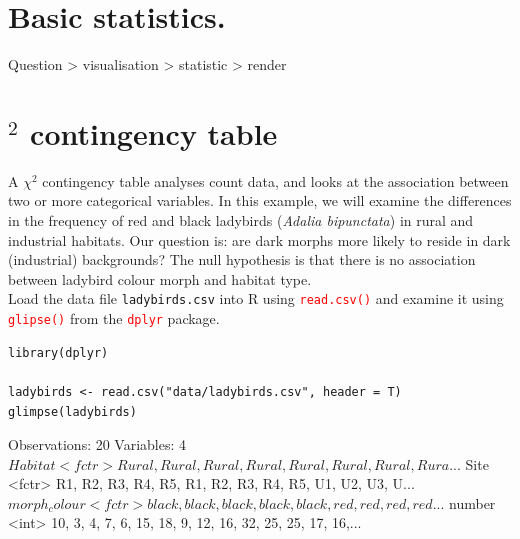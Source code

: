 \documentclass[a4paper,12pt]{article}
\newcommand\code[1]{\textcolor{red}{\texttt{#1}}}
\begin{document}

\section{Basic statistics.}

Question > visualisation > statistic > render

\section{\chi$^{2}$ contingency table}

A $\chi ^{2}$ contingency table analyses count data, and looks at the association between two or more categorical variables. In this example, we will examine the differences in the frequency of red and black ladybirds (\textit{Adalia bipunctata}) in rural and industrial habitats. Our question is: are dark morphs more likely to reside in dark (industrial) backgrounds? The null hypothesis is that there is no association between ladybird colour morph and habitat type. \\

Load the data file \texttt{ladybirds.csv} into R using \code{read.csv()} and examine it using \code{glipse()} from the \code{dplyr} package.\\

\begin{shaded}
\begin{verbatim}
library(dplyr)

ladybirds <- read.csv("data/ladybirds.csv", header = T)
glimpse(ladybirds)
\end{verbatim}
\end{shaded}

\begin{Schunk}
\begin{Soutput}
Observations: 20
Variables: 4
$ Habitat      <fctr> Rural, Rural, Rural, Rural, Rural, Rural, Rural, Rura...
$ Site         <fctr> R1, R2, R3, R4, R5, R1, R2, R3, R4, R5, U1, U2, U3, U...
$ morph_colour <fctr> black, black, black, black, black, red, red, red, red...
$ number       <int> 10, 3, 4, 7, 6, 15, 18, 9, 12, 16, 32, 25, 25, 17, 16,...
\end{Soutput}
\end{Schunk}
\end{document}
